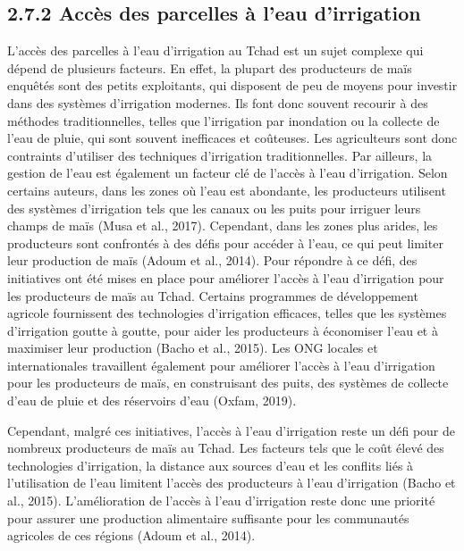 \documentclass[12pt,oneside]{report}
\begin{document}
\subsection{2.7.2 Accès des parcelles à l’eau d’irrigation}
L'accès des parcelles à l'eau d'irrigation au Tchad est un sujet complexe qui dépend de plusieurs facteurs. En effet, la plupart des producteurs de maïs enquêtés sont des petits exploitants, qui disposent de peu de moyens pour investir dans des systèmes d'irrigation modernes. Ils font donc souvent recourir à des méthodes traditionnelles, telles que l'irrigation par inondation ou la collecte de l'eau de pluie, qui sont souvent inefficaces et coûteuses. Les agriculteurs sont donc contraints d'utiliser des techniques d'irrigation traditionnelles. Par ailleurs, la gestion de l'eau est également un facteur clé de l'accès à l'eau d'irrigation. Selon certains auteurs, dans les zones où l'eau est abondante, les producteurs utilisent des systèmes d'irrigation tels que les canaux ou les puits pour irriguer leurs champs de maïs (Musa et al., 2017). Cependant, dans les zones plus arides, les producteurs sont confrontés à des défis pour accéder à l'eau, ce qui peut limiter leur production de maïs (Adoum et al., 2014). Pour répondre à ce défi, des initiatives ont été mises en place pour améliorer l'accès à l'eau d'irrigation pour les producteurs de maïs au Tchad. Certains programmes de développement agricole fournissent des technologies d'irrigation efficaces, telles que les systèmes d'irrigation goutte à goutte, pour aider les producteurs à économiser l'eau et à maximiser leur production (Bacho et al., 2015). Les ONG locales et internationales travaillent également pour améliorer l'accès à l'eau d'irrigation pour les producteurs de maïs, en construisant des puits, des systèmes de collecte d'eau de pluie et des réservoirs d'eau (Oxfam, 2019).

Cependant, malgré ces initiatives, l'accès à l'eau d'irrigation reste un défi pour de nombreux producteurs de maïs au Tchad. Les facteurs tels que le coût élevé des technologies d'irrigation, la distance aux sources d'eau et les conflits liés à l'utilisation de l'eau limitent l'accès des producteurs à l'eau d'irrigation (Bacho et al., 2015). L'amélioration de l'accès à l'eau d'irrigation reste donc une priorité pour assurer une production alimentaire suffisante pour les communautés agricoles de ces régions (Adoum et al., 2014).
\end{document}
